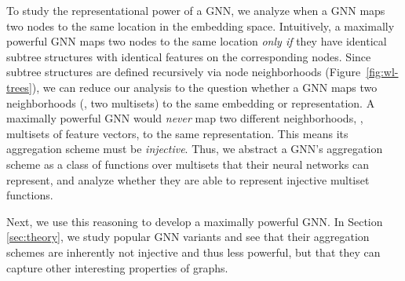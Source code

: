 To study the representational power of a GNN, we analyze when a GNN maps two nodes to the same location in the embedding space. Intuitively, a maximally powerful GNN maps two nodes to the same location \textit{only if} they have identical subtree structures with identical features on the corresponding nodes. Since subtree structures are defined recursively via node neighborhoods (Figure~\ref{fig:wl-trees}), we can reduce our analysis to the question whether a GNN maps two neighborhoods (\ie, two multisets) to the same embedding or representation. A maximally powerful GNN would \textit{never} map two different neighborhoods, \ie, multisets of feature vectors, to the same representation. This means its aggregation scheme must be \textit{injective}. Thus, we abstract a GNN's aggregation scheme as a class of functions over multisets that their neural networks can represent, and analyze whether they are able to represent injective multiset functions. 

Next, we use this reasoning to develop a maximally powerful GNN. In Section \ref{sec:theory}, we study popular GNN variants and see that their aggregation schemes are inherently not injective and thus less powerful, but that they can capture other interesting properties of graphs.